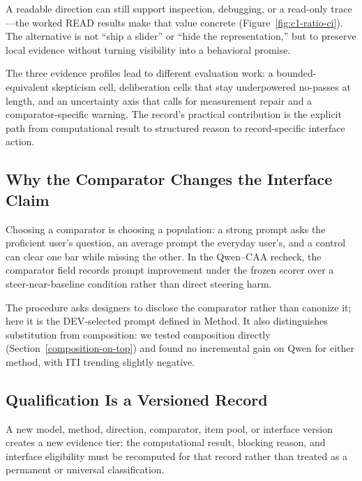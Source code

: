 \documentclass[manuscript,review,anonymous]{acmart}
\begin{document}
A readable direction can still support inspection, debugging, or a read-only trace---the worked READ results make that value concrete (Figure~\ref{fig:c1-ratio-ci}). {}%
{}%
The alternative is not ``ship a slider'' or ``hide the representation,'' but to preserve local evidence without turning visibility into a behavioral promise.

The three evidence profiles lead to different evaluation work: a bounded-equivalent skepticism cell, deliberation cells that stay underpowered no-passes at length, and an uncertainty axis that calls for measurement repair and a comparator-specific warning. {}%
{}%
{}%
The record's practical contribution is the explicit path from computational result to structured reason to record-specific interface action.

\subsection{Why the Comparator Changes the Interface Claim}\label{why-the-comparator-changes-the-interface-claim}

Choosing a comparator is choosing a population: a strong prompt asks the proficient user's question, an average prompt the everyday user's, and a control can clear one bar while missing the other. In the Qwen--CAA recheck, the comparator field records prompt improvement under the frozen scorer over a steer-near-baseline condition rather than direct steering harm. {}%
{}%

The procedure asks designers to disclose the comparator rather than canonize it; here it is the DEV-selected prompt defined in Method. {}%
{}%
{}%
It also distinguishes substitution from composition: we tested composition directly (Section~\ref{composition-on-top}) and found no incremental gain on Qwen for either method, with ITI trending slightly negative. {}%


\subsection{Qualification Is a Versioned Record}\label{qualification-is-a-versioned-record}

A new model, method, direction, comparator, item pool, or interface version creates a new evidence tier: the computational result, blocking reason, and interface eligibility must be recomputed for that record rather than treated as a permanent or universal classification.
\end{document}
